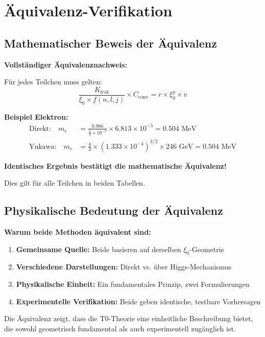 \documentclass[12pt,a4paper]{article}
\begin{document}
	\section{Äquivalenz-Verifikation}
	
	\subsection{Mathematischer Beweis der Äquivalenz}
	
	\begin{equivalence}
		\textbf{Vollständiger Äquivalenznachweis:}
		
		Für jedes Teilchen muss gelten:
		\begin{equation}
			\frac{K_{\text{frak}}}{\xi_0 \times f(n,l,j)} \times C_{\text{conv}} = r \times \xi_0^p \times v
		\end{equation}
		
		\textbf{Beispiel Elektron:}
		\begin{align}
			\text{Direkt:} \quad m_e &= \frac{0.986}{\frac{4}{3} \times 10^{-4}} \times 6.813 \times 10^{-5} = 0.504 \text{ MeV} \\
			\text{Yukawa:} \quad m_e &= \frac{4}{3} \times (1.333 \times 10^{-4})^{3/2} \times 246 \text{ GeV} = 0.504 \text{ MeV}
		\end{align}
		
		\textbf{Identisches Ergebnis bestätigt die mathematische Äquivalenz!}
		
		Dies gilt für alle Teilchen in beiden Tabellen.
	\end{equivalence}
	
	\subsection{Physikalische Bedeutung der Äquivalenz}
	
	\begin{keyresult}
		\textbf{Warum beide Methoden äquivalent sind:}
		
		\begin{enumerate}
			\item \textbf{Gemeinsame Quelle:} Beide basieren auf derselben $\xi_0$-Geometrie
			
			\item \textbf{Verschiedene Darstellungen:} Direkt vs. über Higgs-Mechanismus
			
			\item \textbf{Physikalische Einheit:} Ein fundamentales Prinzip, zwei Formulierungen
			
			\item \textbf{Experimentelle Verifikation:} Beide geben identische, testbare Vorhersagen
		\end{enumerate}
		
		Die Äquivalenz zeigt, dass die T0-Theorie eine einheitliche Beschreibung bietet, die sowohl geometrisch fundamental als auch experimentell zugänglich ist.
	\end{keyresult}
	
\end{document}
